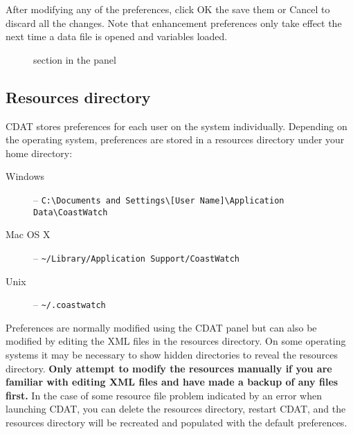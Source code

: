 After modifying any of the preferences, click {\gui OK} the save
them or {\gui Cancel} to discard all the changes.  Note that
enhancement preferences only take effect the next time a data
file is opened and variables loaded.

\begin{figure}
  \begin{center}
    \caption[Enhancement section in the Preferences panel]{
        section in the
        panel
    }
    \label{enhancement_prefs}
  \end{center}
\end{figure}

\subsection{Resources directory}
\label{resources}

CDAT stores preferences for each user on the system individually.
Depending on the operating system, preferences are stored in a
resources directory under your home directory:
\begin{description}

\item[Windows] -- \verb+C:\Documents and Settings\[User Name]\Application Data\CoastWatch+

\item[Mac OS X] -- \verb+~/Library/Application Support/CoastWatch+

\item[Unix] -- \verb+~/.coastwatch+

\end{description}
Preferences are normally modified using the CDAT
 panel but can also be modified
by editing the XML files in the resources directory.  On some
operating systems it may be necessary to show hidden directories
to reveal the resources directory.  {\bf Only attempt to modify
the resources manually if you are familiar with editing XML files
and have made a backup of any files first.}  In the case of some
resource file problem indicated by an error when launching CDAT,
you can delete the resources directory, restart CDAT, and the
resources directory will be recreated and populated with the
default preferences.

